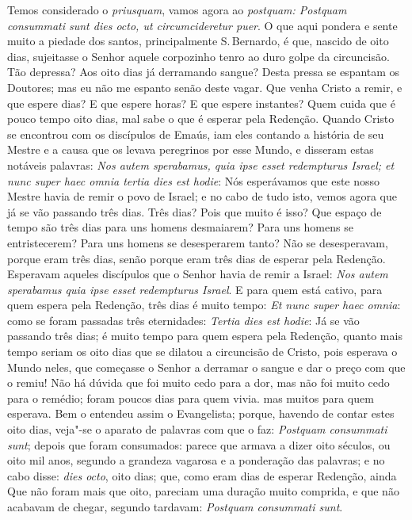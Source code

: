 Temos considerado o \emph{priusquam}, vamos agora ao \emph{postquam:
Postquam consummati sunt dies octo, ut circumcideretur puer}. O que aqui
pondera e sente muito a piedade dos santos, principalmente S.\,Bernardo,
é que, nascido de oito dias, sujeitasse o Senhor aquele corpozinho tenro
ao duro golpe da circuncisão. Tão depressa? Aos oito dias já derramando
sangue? Desta pressa se espantam os Doutores; mas eu não me espanto
senão deste vagar. Que venha Cristo a remir, e que espere dias? E que
espere horas? E que espere instantes? Quem cuida que é pouco tempo
oito dias, mal sabe o que é esperar pela Redenção.
Quando Cristo se encontrou com os discípulos de Emaús, iam eles contando
a história de seu Mestre e a causa que os levava peregrinos por esse
Mundo, e disseram estas notáveis palavras: \emph{Nos autem sperabamus,
quia ipse esset redempturus Israel; et nunc super haec omnia tertia dies
est hodie}: Nós esperávamos que este nosso Mestre havia de remir o povo
de Israel; e no cabo de tudo isto, vemos agora que já se vão passando
três dias. Três dias? Pois que muito é isso? Que espaço de tempo são
três dias para uns homens desmaiarem? Para uns homens se entristecerem?
Para uns homens se desesperarem tanto? Não se desesperavam, porque
eram três dias, senão porque eram três dias de esperar pela Redenção.
Esperavam aqueles discípulos que o Senhor havia de remir a Israel:
\emph{Nos autem sperabamus quia ipse esset redempturus Israel}. E para
quem está cativo, para quem espera pela Redenção, três dias é muito
tempo: \emph{Et nunc super haec omnia}: como se foram passadas três
eternidades: \emph{Tertia dies est hodie}: Já se vão passando três dias;
é muito tempo para quem espera pela Redenção, quanto mais tempo seriam
os oito dias que se dilatou a circuncisão de Cristo, pois
esperava o Mundo neles, que começasse o Senhor a derramar o sangue e dar
o preço com que o remiu!
Não há dúvida que foi muito cedo para a dor, mas não foi muito cedo para
o remédio; foram poucos dias para quem vivia. mas muitos para quem
esperava. Bem o entendeu assim o Evangelista; porque, havendo de contar
estes oito dias, veja"-se
o aparato de palavras com que o faz: \emph{Postquam consummati sunt};
depois que foram consumados: parece que armava a dizer oito séculos,
ou oito mil anos, segundo a grandeza vagarosa e a ponderação das
palavras; e no cabo disse: \emph{dies octo}, oito dias; que, como eram
dias de esperar Redenção, ainda Que não foram mais que oito, pareciam
uma duração muito comprida, e que não acabavam de chegar, segundo
tardavam: \emph{Postquam consummati sunt}.

